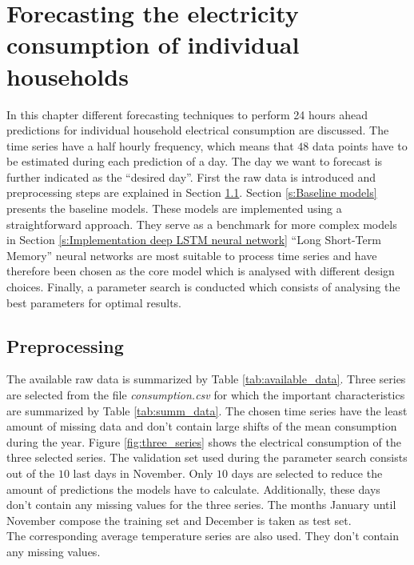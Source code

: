 \chapter{Forecasting the electricity consumption of individual households}
\label{cha:Forecasting the daily electricity consumption}
In this chapter different forecasting techniques to perform 24 hours ahead predictions for individual household electrical consumption are discussed. The time series have a half hourly frequency, which means that $ 48 $ data points have to be estimated during each prediction of a day. The day we want to forecast is further indicated as the ``desired day''. First the raw data is introduced and preprocessing steps are explained in Section \ref{s:Preprocessing_cha4}. Section \ref{s:Baseline models} presents the baseline models. These models are implemented using a straightforward approach. They serve as a benchmark for more complex models in Section \ref{s:Implementation deep LSTM neural network} ``Long Short-Term Memory'' neural networks are most suitable to process time series and have therefore been chosen as the core model which is analysed with different design choices. Finally, a parameter search is conducted which consists of analysing the best parameters for optimal results.
 
\section{Preprocessing}\label{s:Preprocessing_cha4}
The available raw data is summarized by Table \ref{tab:available_data}. 
Three series are selected from the file \textit{consumption.csv} for which the important characteristics are summarized by Table \ref{tab:summ_data}. The chosen time series have the least amount of missing data and don't contain large shifts of the mean consumption during the year. Figure \ref{fig:three_series} shows the electrical consumption of the three selected series. The validation set used during the parameter search consists out of the $ 10 $ last days in November. Only $ 10 $ days are selected to reduce the amount of predictions the models have to calculate. Additionally, these days don't contain any missing values for the three series. The months January until  November compose the training set and December is taken as test set.\\ 
The corresponding average temperature series are also used. They don't contain any missing values.

